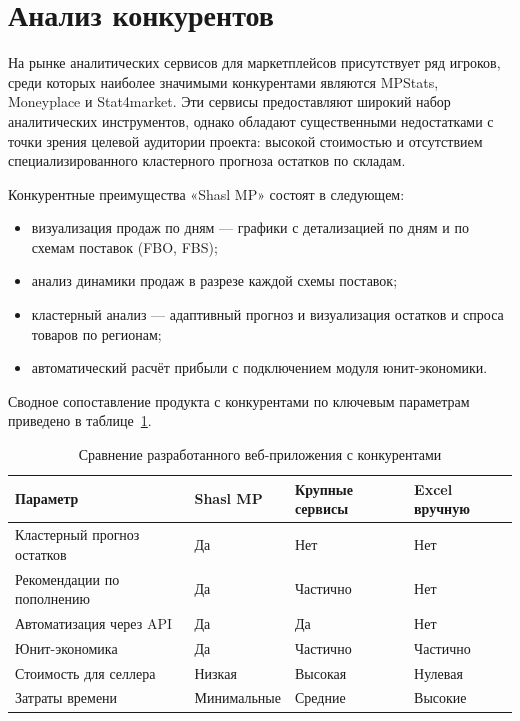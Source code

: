 \section{Анализ конкурентов}

На рынке аналитических сервисов для маркетплейсов присутствует ряд игроков, среди которых наиболее значимыми конкурентами являются MPStats, Moneyplace и Stat4market. Эти сервисы предоставляют широкий набор аналитических инструментов, однако обладают существенными недостатками с точки зрения целевой аудитории проекта: высокой стоимостью и отсутствием специализированного кластерного прогноза остатков по складам.

Конкурентные преимущества «Shasl MP» состоят в следующем:

\begin{itemize}
\item визуализация продаж по дням --- графики с детализацией по дням и по схемам поставок (FBO, FBS);
\item анализ динамики продаж в разрезе каждой схемы поставок;
\item кластерный анализ --- адаптивный прогноз и визуализация остатков и спроса товаров по регионам;
\item автоматический расчёт прибыли с подключением модуля юнит-экономики.
\end{itemize}

Сводное сопоставление продукта с конкурентами по ключевым параметрам приведено в таблице~\ref{tab:competitors}.

\begin{table}[H]
\caption{Сравнение разработанного веб-приложения с конкурентами}
\label{tab:competitors}
\begin{center}
\vspace{-0.5cm}\begin{tabular}{|p{5cm}|p{3cm}|p{3.25cm}|p{3.25cm}|}
\hline
Параметр & Shasl MP & Крупные сервисы & Excel вручную \\ \hline
Кластерный прогноз остатков & Да & Нет & Нет \\ \hline
Рекомендации по пополнению & Да & Частично & Нет \\ \hline
Автоматизация через API & Да & Да & Нет \\ \hline
Юнит-экономика & Да & Частично & Частично \\ \hline
Стоимость для селлера & Низкая & Высокая & Нулевая \\ \hline
Затраты времени & Минимальные & Средние & Высокие \\ \hline
\end{tabular}
\end{center}
\end{table}

